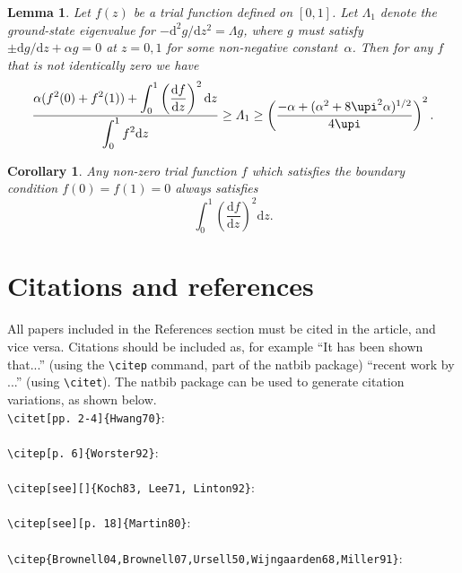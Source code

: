 \documentclass[lineno]{jfm}
\newtheorem{lemma}{Lemma}
\newtheorem{corollary}{Corollary}
\begin{document}
\begin{lemma}
Let $f(z)$ be a trial \citet[][pp.~231--232]{Batchelor59} function defined on $[0,1]$.  Let $\varLambda_1$ denote
the ground-state eigenvalue for $-\mathrm{d}^2g/\mathrm{d} z^2=\varLambda g$,
where $g$ must satisfy $\pm\mathrm{d} g/\mathrm{d} z+\alpha g=0$ at $z=0,1$
for some non-negative constant~$\alpha$.  Then for any $f$ that is not
identically zero we have
\begin{equation}
\frac{\displaystyle
  \alpha(f^2(0)+f^2(1)) + \int_0^1 \left(
  \frac{\mathrm{d} f}{\mathrm{d} z} \right)^2 \mathrm{d} z}%
  {\displaystyle \int_0^1 f^2\mathrm{d} z}
\ge \varLambda_1 \ge
\left( \frac{-\alpha+(\alpha^2+8\upi^2\alpha)^{1/2}}{4\upi} \right)^2.
\end{equation}
\end{lemma}

\begin{corollary}
Any non-zero trial function $f$ which satisfies the boundary condition
$f(0)=f(1)=0$ always satisfies
\begin{equation}
  \int_0^1 \left( \frac{\mathrm{d} f}{\mathrm{d} z} \right)^2 \mathrm{d} z.
\end{equation}
\end{corollary}

\section{Citations and references}
All papers included in the References section must be cited in the article, and vice versa. Citations should be included as, for example ``It has been shown \citep{Rogallo81} that...'' (using the {\verb}\citep}} command, part of the natbib package) ``recent work by \citet{Dennis85}...'' (using {\verb}\citet}}).
The natbib package can be used to generate citation variations, as shown below.\\
\verb#\citet[pp. 2-4]{Hwang70}#:\\
\citet[pp. 2-4]{Hwang70} \\
\verb#\citep[p. 6]{Worster92}#:\\
\citep[p. 6]{Worster92}\\
\verb#\citep[see][]{Koch83, Lee71, Linton92}#:\\
\citep[see][]{Koch83, Lee71, Linton92}\\
\verb#\citep[see][p. 18]{Martin80}#:\\
\citep[see][p. 18]{Martin80}\\
\verb#\citep{Brownell04,Brownell07,Ursell50,Wijngaarden68,Miller91}#:\\
\citep{Brownell04,Brownell07,Ursell50,Wijngaarden68,Miller91}\\
\citep{Briukhanovetal1967}\\
\cite{Bouguet01}\\
\citep{JosephSaut1990}\\
\end{document}
